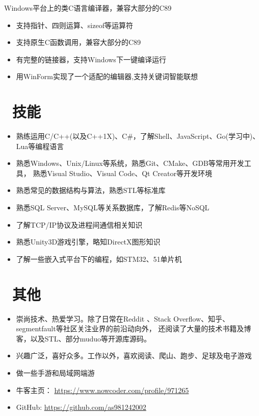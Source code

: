 \documentclass{resume}
\begin{document}
\begin{onehalfspacing}
Windows平台上的类C语言编译器，兼容大部分的C89
\begin{itemize}
  \item 支持指针、四则运算、sizeof等运算符
  \item 支持原生C函数调用，兼容大部分的C89
  \item 有完整的链接器，支持Windows下一键编译运行
  \item 用WinForm实现了一个适配的编辑器,支持关键词智能联想
\end{itemize}
\end{onehalfspacing}



\section{\faCogs\ 技能}
\begin{itemize}[parsep=0.5ex]
  \item 熟练运用C/C++(以及C++1X)、C\#，了解Shell、JavaScript、Go(学习中)、Lua等编程语言
  \item 熟悉Windows、Unix/Linux等系统，熟悉Git、CMake、GDB等常用开发工具，
	   熟悉Visual Studio、Visual Code、Qt Creator等开发环境
  \item 熟悉常见的数据结构与算法，熟悉STL等标准库
  \item 熟悉SQL Server、MySQL等关系数据库，了解Redis等NoSQL
  \item 了解TCP/IP协议及进程间通信相关知识
  \item 熟悉Unity3D游戏引擎，略知DirectX图形知识
  \item 了解一些嵌入式平台下的编程，如STM32、51单片机
\end{itemize}


\section{\faInfo\ 其他}
\begin{itemize}[parsep=0.25ex]
  \item 崇尚技术、热爱学习。除了日常在Reddit 、Stack Overflow、知乎、segmentfault等社区关注业界的前沿动向外，
	   还阅读了大量的技术书籍及博客，以及STL、部分muduo等开源库源码。
  \item 兴趣广泛，喜好众多。工作以外，喜欢阅读、爬山、跑步、足球及电子游戏
  \item 做一些手游和局域网端游
  \item 牛客主页： \url{https://www.nowcoder.com/profile/971265}
  \item GitHub: \url{https://github.com/as981242002}
\end{itemize}

%
%
\end{document}

